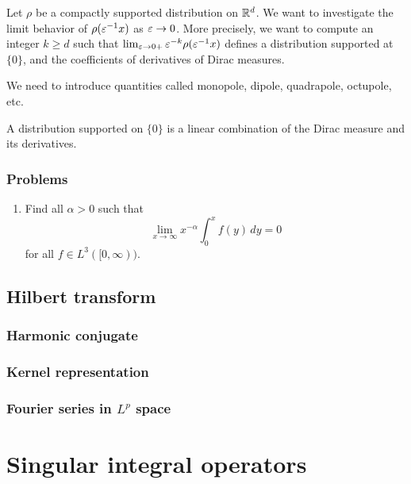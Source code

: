 \documentclass{../../large}
\begin{document}
\begin{prb}
Let $\rho$ be a compactly supported distribution on $\mathbb{R}^d$.
We want to investigate the limit behavior of $\rho(\varepsilon^{-1}x)$ as $\varepsilon\to0$.
More precisely, we want to compute an integer $k\ge d$ such that $\lim_{\varepsilon\to0+}\varepsilon^{-k}\rho(\varepsilon^{-1}x)$ defines a distribution supported at $\{0\}$, and the coefficients of derivatives of Dirac measures.

We need to introduce quantities called monopole, dipole, quadrapole, octupole, etc.
\begin{parts}
\item A distribution supported on $\{0\}$ is a linear combination of the Dirac measure and its derivatives.
\item 
\end{parts}
\end{prb}

\section*{Problems}
\begin{enumerate}
\item Find all $\alpha>0$ such that
\[\lim_{x\to\infty}x^{-\alpha}\int_0^xf(y)\,dy=0\]
for all $f\in L^3([0,\infty))$.
\end{enumerate}








\chapter{Hilbert transform}

\section{Harmonic conjugate}
\section{Kernel representation}
\section{Fourier series in $L^p$ space}









\part{Singular integral operators}
\end{document}
